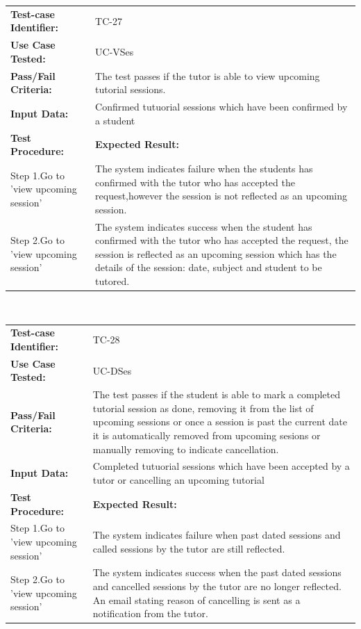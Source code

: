 \documentclass[12pt]{article}
\begin{document}
{\begin{tabular}{| p{8cm} | p{8cm} |} \hline
	\textbf{Test-case Identifier:}& TC-27\\
	\textbf{Use Case Tested:}& UC-VSes\\
	\textbf{Pass/Fail Criteria:}& The test passes if the tutor is able to view upcoming tutorial sessions.\\
	\textbf{Input Data:}& Confirmed tutuorial sessions which have been confirmed by a student\\\hline
	\textbf{Test Procedure:}& \textbf{Expected Result:} \\\hline
	Step 1.Go to 'view upcoming session' & The system indicates failure when the students has confirmed with the tutor who has accepted the request,however the session is not reflected as an upcoming session. \\
	Step 2.Go to 'view upcoming session' & The system indicates success when the student has confirmed with the tutor who has accepted the request, the session is reflected as an upcoming session which has the details of the session: date, subject and student to be tutored. \\
		\hline
\end{tabular}
\\

\begin{tabular}{| p{8cm} | p{8cm} |} \hline
	\textbf{Test-case Identifier:}& TC-28\\
	\textbf{Use Case Tested:}& UC-DSes\\
	\textbf{Pass/Fail Criteria:}& The test passes if the student is able to mark a completed tutorial session as done, removing it from the list of upcoming sessions or once a session is past the current date it is automatically removed from upcoming sesions or manually removing to indicate cancellation.\\
	\textbf{Input Data:}& Completed tutuorial sessions which have been accepted by a tutor or cancelling an upcoming tutorial\\\hline
	\textbf{Test Procedure:}& \textbf{Expected Result:} \\\hline
	Step 1.Go to 'view upcoming session' & The system indicates failure when past dated sessions and called sessions by the tutor are still reflected. \\
	Step 2.Go to 'view upcoming session' & The system indicates success when the past dated sessions and cancelled sessions by the tutor are no longer reflected. An email stating reason of cancelling is sent as a notification from the tutor.\\
		\hline
\end{tabular}
\\

}
\end{document}
